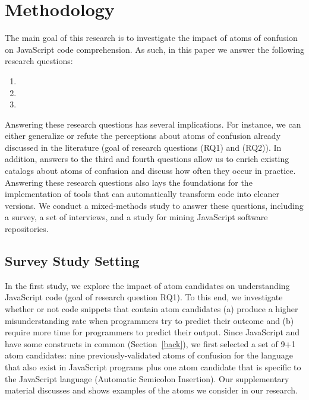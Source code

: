 \section{Methodology}
\label{method}

The main goal of this research is to investigate the impact of atoms of confusion on JavaScript code comprehension. As such, in this paper we answer the following research questions: 

\begin{enumerate}[(RQ1)]
\item \rqa 
\item \rqb
\item \rqd
\end{enumerate}

 
Answering these research questions has several implications. For instance, we can either generalize or refute the perceptions about atoms of confusion already discussed in the literature (goal of research questions (RQ1) and (RQ2)). In addition, answers to the third and fourth questions allow us to enrich existing catalogs about atoms of confusion and discuss how often they occur in practice. Answering these research questions also lays the foundations for the implementation of tools that can automatically transform code into cleaner versions.
We conduct a mixed-methods study to answer these questions, including a survey, a set of interviews, and a study for mining JavaScript software repositories.  


\subsection{Survey Study Setting}\label{sec:meth:survey}

In the first study, we explore the impact of atom candidates on
understanding JavaScript code (goal of research question RQ1).	
To this end, we investigate whether or not code snippets that
contain atom candidates (a) produce a higher
misunderstanding rate when programmers
try to predict their outcome and (b) require more time for programmers to predict their output.
Since JavaScript and \clang have some constructs in common (Section~\ref{back}), we first selected a set of 9+1 atom candidates: nine previously-validated atoms of confusion for the \clang language~\cite{DBLP:conf/sigsoft/GopsteinIYDZYC17} that also exist in JavaScript programs plus one atom candidate that is specific to the JavaScript language (Automatic Semicolon Insertion).
Our supplementary material discusses and shows examples of the atoms we consider in our research. 

